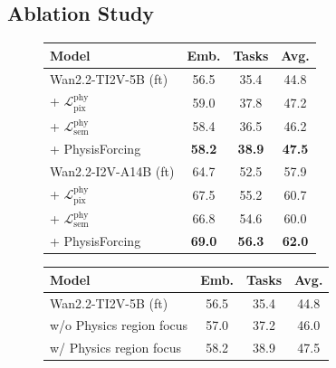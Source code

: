 \documentclass{llmxive}
\providecommand{\arraystretch}{1.15}
\begin{document}
\subsection{Ablation Study}
\label{sec:ablation}

\begin{figure}[t]
\centering
\footnotesize
\setlength{\tabcolsep}{4pt}
\renewcommand{\arraystretch}{1.0}
\begin{minipage}[t]{0.47\linewidth}
\vspace{0pt}
\centering
{}
\label{tab:ablation_R-Bench}
\begin{tabular}{lccc}
\toprule
\textbf{Model} & \textbf{Emb.} & \textbf{Tasks} & \textbf{Avg.} \\
\midrule
Wan2.2-TI2V-5B (ft) & 56.5 & 35.4 & 44.8 \\
\quad + $\mathcal{L}^{\mathrm{phy}}_{\mathrm{pix}}$ & 59.0 & 37.8 & 47.2 \\
\quad + $\mathcal{L}^{\mathrm{phy}}_{\mathrm{sem}}$ & 58.4 & 36.5 & 46.2 \\
\quad + PhysisForcing & \textbf{58.2} & \textbf{38.9} & \textbf{47.5} \\
\midrule
Wan2.2-I2V-A14B (ft) & 64.7 & 52.5 & 57.9 \\
\quad + $\mathcal{L}^{\mathrm{phy}}_{\mathrm{pix}}$ & 67.5 & 55.2 & 60.7 \\
\quad + $\mathcal{L}^{\mathrm{phy}}_{\mathrm{sem}}$ & 66.8 & 54.6 & 60.0 \\
\quad + PhysisForcing & \textbf{69.0} & \textbf{56.3} & \textbf{62.0} \\
\bottomrule
\end{tabular}

\vspace{0.25em}

\label{tab:ablation_region}
\begin{tabular}{lccc}
\toprule
\textbf{Model} & \textbf{Emb.} & \textbf{Tasks} & \textbf{Avg.} \\
\midrule
Wan2.2-TI2V-5B (ft) & 56.5 & 35.4 & 44.8 \\
w/o Physics region focus & 57.0  & 37.2  & 46.0  \\
w/ Physics region focus & 58.2 & 38.9 & 47.5 \\
\bottomrule
\end{tabular}

\vspace{0.25em}


\end{minipage}
\end{figure}
\end{document}
